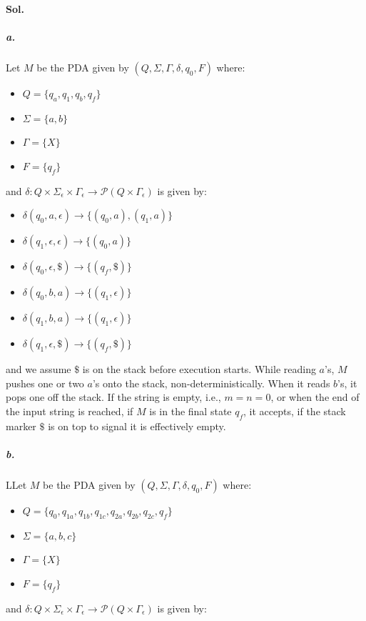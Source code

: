 \documentclass[]{article}
\begin{document}
	\paragraph{Sol.}
	\subparagraph{a.}
	Let $M$ be the PDA given by $(Q, \Sigma, \Gamma, \delta, q_0, F)$ where:
	\begin{itemize}[label={}, noitemsep]
		\item $Q = \{q_a, q_1, q_b, q_f\}$
		\item $\Sigma = \{a, b\}$
		\item $\Gamma = \{X\}$
		\item $F = \{q_f\}$
	\end{itemize}
	and $\delta: Q \times \Sigma_\epsilon \times \Gamma_\epsilon \rightarrow \mathcal{P}(Q \times \Gamma_\epsilon)$ is given by: 
	\begin{itemize}[label={}, noitemsep]
		\item $\delta(q_0, a, \epsilon) \rightarrow \{(q_0, a), (q_1, a)\}$
		\item $\delta(q_1, \epsilon, \epsilon) \rightarrow \{(q_0, a)\}$
		\item $\delta(q_0, \epsilon, \$) \rightarrow \{(q_f, \$)\}$
		\item $\delta(q_0, b, a) \rightarrow \{(q_1, \epsilon)\}$
		\item $\delta(q_1, b, a) \rightarrow \{(q_1, \epsilon)\}$
		\item $\delta(q_1, \epsilon, \$) \rightarrow \{(q_f, \$)\}$
	\end{itemize}
	and we assume $\$$ is on the stack before execution starts.
	While reading $a$'s, $M$ pushes one or two $a$'s onto the stack, non-deterministically. When it reads $b$'s, it pops one off the stack. If the string is empty, i.e., $m = n = 0$, or when the end of the input string is reached, if $M$ is in the final state $q_f$, it accepts, if the stack marker $\$$ is on top to signal it is effectively empty.
	\subparagraph{b.}
	LLet $M$ be the PDA given by $(Q, \Sigma, \Gamma, \delta, q_0, F)$ where:
	\begin{itemize}[label={}, noitemsep]
		\item $Q = \{q_0, q_{1a}, q_{1b}, q_{1c}, q_{2a}, q_{2b}, q_{2c}, q_f\}$
		\item $\Sigma = \{a, b, c\}$
		\item $\Gamma = \{X\}$
		\item $F = \{q_f\}$
	\end{itemize}
	and $\delta: Q \times \Sigma_\epsilon \times \Gamma_\epsilon \rightarrow \mathcal{P}(Q \times \Gamma_\epsilon)$ is given by: 
\end{document}
